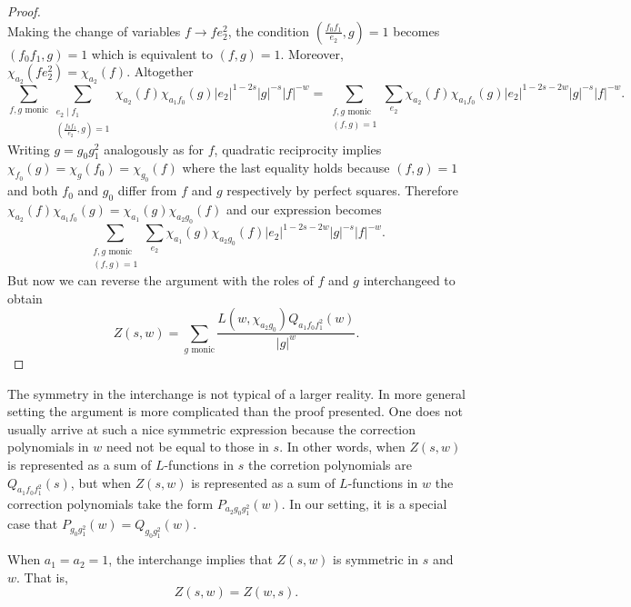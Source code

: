 \documentclass[12pt,reqno,oneside]{amsart}
\begin{document}
\begin{proof}
\[        \]
        Making the change of variables $f \to fe_{2}^{2}$, the condition $\left(\frac{f_{0}f_{1}}{e_{2}},g\right) = 1$ becomes $(f_{0}f_{1},g) = 1$ which is equivalent to $(f,g) = 1$. Moreover, $\chi_{a_{2}}(fe_{2}^{2}) = \chi_{a_{2}}(f)$. Altogether 
        \[
            \sum_{\text{$f,g$ monic}}\sum_{\substack{e_{2} \mid f_{1} \\ \left(\frac{f_{0}f_{1}}{e_{2}},g\right) = 1}}\chi_{a_{2}}(f)\chi_{a_{1}f_{0}}(g)|e_{2}|^{1-2s}|g|^{-s}|f|^{-w} = \sum_{\substack{\text{$f,g$ monic} \\ (f,g) = 1}}\sum_{e_{2}}\chi_{a_{2}}(f)\chi_{a_{1}f_{0}}(g)|e_{2}|^{1-2s-2w}|g|^{-s}|f|^{-w}.
        \]
        Writing $g = g_{0}g_{1}^{2}$ analogously as for $f$, quadratic reciprocity implies $\chi_{f_{0}}(g) = \chi_{g}(f_{0}) = \chi_{g_{0}}(f)$ where the last equality holds because $(f,g) = 1$ and both $f_{0}$ and $g_{0}$ differ from $f$ and $g$ respectively by perfect squares. Therefore $\chi_{a_{2}}(f)\chi_{a_{1}f_{0}}(g) = \chi_{a_{1}}(g)\chi_{a_{2}g_{0}}(f)$ and our expression becomes
        \[
            \sum_{\substack{\text{$f,g$ monic} \\ (f,g) = 1}}\sum_{e_{2}}\chi_{a_{1}}(g)\chi_{a_{2}g_{0}}(f)|e_{2}|^{1-2s-2w}|g|^{-s}|f|^{-w}.
        \]
        But now we can reverse the argument with the roles of $f$ and $g$ interchangeed to obtain
        \[
            Z(s,w) = \sum_{\text{$g$ monic}}\frac{L(w,\chi_{a_{2}g_{0}})Q_{a_{1}f_{0}f_{1}^{2}}(w)}{|g|^{w}}.
        \]
    \end{proof}

    The symmetry in the interchange is not typical of a larger reality. In more general setting the argument is more complicated than the proof presented. One does not usually arrive at such a nice symmetric expression because the correction polynomials in $w$ need not be equal to those in $s$. In other words, when $Z(s,w)$ is represented as a sum of $L$-functions in $s$ the corretion polynomials are $Q_{a_{1}f_{0}f_{1}^{2}}(s)$, but when $Z(s,w)$ is represented as a sum of $L$-functions in $w$ the correction polynomials take the form $P_{a_{2}g_{0}g_{1}^{2}}(w)$. In our setting, it is a special case that $P_{g_{0}g_{1}^{2}}(w) = Q_{g_{0}g_{1}^{2}}(w)$.

    \begin{remark}\label{rem:symmetry_of_Double_Dirichlet_series}
        When $a_{1} = a_{2} = 1$, the interchange implies that $Z(s,w)$ is symmetric in $s$ and $w$. That is,
        \[
            Z(s,w) = Z(w,s).
        \]
    \end{remark}
\end{document}
